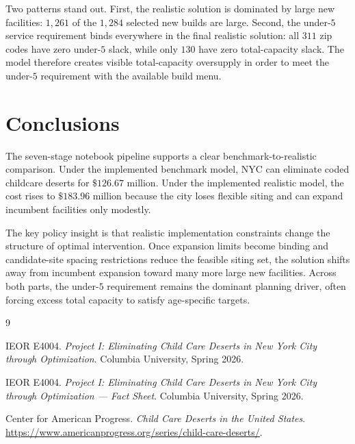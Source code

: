 \documentclass[11pt]{article}
\begin{document}
Two patterns stand out. First, the realistic solution is dominated by large new facilities: \(1{,}261\) of the \(1{,}284\) selected new builds are large. Second, the under-\(5\) service requirement binds everywhere in the final realistic solution: all \(311\) zip codes have zero under-\(5\) slack, while only \(130\) have zero total-capacity slack. The model therefore creates visible total-capacity oversupply in order to meet the under-\(5\) requirement with the available build menu.

\section{Conclusions}

The seven-stage notebook pipeline supports a clear benchmark-to-realistic comparison. Under the implemented benchmark model, NYC can eliminate coded childcare deserts for \(\$126.67\) million. Under the implemented realistic model, the cost rises to \(\$183.96\) million because the city loses flexible siting and can expand incumbent facilities only modestly.

The key policy insight is that realistic implementation constraints change the structure of optimal intervention. Once expansion limits become binding and candidate-site spacing restrictions reduce the feasible siting set, the solution shifts away from incumbent expansion toward many more large new facilities. Across both parts, the under-\(5\) requirement remains the dominant planning driver, often forcing excess total capacity to satisfy age-specific targets.

\begin{thebibliography}{9}

IEOR E4004.
\emph{Project I: Eliminating Child Care Deserts in New York City through Optimization}.
Columbia University, Spring 2026.

IEOR E4004.
\emph{Project I: Eliminating Child Care Deserts in New York City through Optimization --- Fact Sheet}.
Columbia University, Spring 2026.

Center for American Progress.
\emph{Child Care Deserts in the United States}.
\url{https://www.americanprogress.org/series/child-care-deserts/}.

\end{thebibliography}
\end{document}
